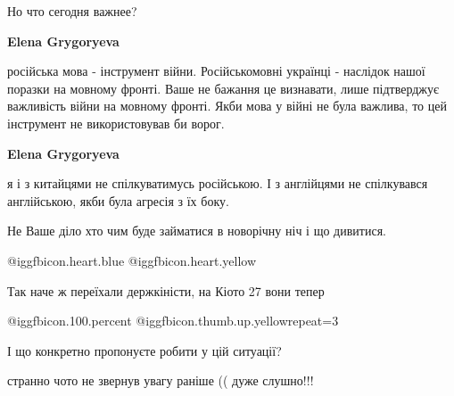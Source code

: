 \begin{itemize}
\begin{itemize}
Но что сегодня важнее?

\textbf{Elena Grygoryeva} 

російська мова - інструмент війни. Російськомовні українці - наслідок нашої
поразки на мовному фронті. Ваше не бажання це визнавати, лише підтверджує
важливість війни на мовному фронті. Якби мова у війні не була важлива, то цей
інструмент не використовував би ворог.

\textbf{Elena Grygoryeva} 

я і з китайцями не спілкуватимусь російською. І з англійцями не спілкувався
англійською, якби була агресія з їх боку.

\end{itemize} %

Не Ваше діло хто чим буде займатися в новорічну ніч і що дивитися.

 @igg{fbicon.heart.blue}  @igg{fbicon.heart.yellow} 

Так наче ж переїхали держкіністи, на Кіото 27 вони тепер

 @igg{fbicon.100.percent}  @igg{fbicon.thumb.up.yellow}{repeat=3} 

І що конкретно пропонуєте робити у цій ситуації?

странно чото не звернув увагу раніше (( дуже слушно!!!

\end{itemize} %
